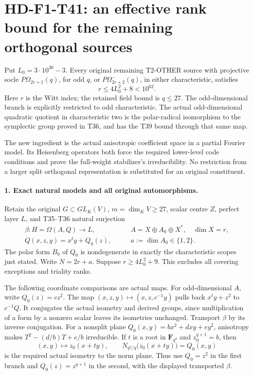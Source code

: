 \section[HD-F1-T41: the remaining orthogonal rank bounds]{HD-F1-T41: an effective rank bound for the remaining orthogonal sources}
\label{sec:f1-remaining-orthogonal-rank-cutoff}

Put \(L_0=3\cdot10^{30}-3\). Every original remaining
T2-OTHER source with projective socle
\(P\Omega_{2r+1}(q)\), for odd \(q\), or
\(P\Omega^-_{2r+2}(q)\), in either characteristic, satisfies
\[
             \boxed{\qquad r\le4L_0^2+8<10^{62}.\qquad}
 \tag{F1T41.1}
\]
Here \(r\) is the Witt index; the retained field bound is
\(q\le27\). The odd-dimensional branch is explicitly
restricted to odd characteristic. The actual odd-dimensional
quadratic quotient in characteristic two is the polar-radical
isomorphism to the symplectic group proved in T36, and has
the T39 bound through that same map.

The new ingredient is the actual anisotropic coefficient
space in a partial Fourier model. Its Heisenberg operators
both force the required lower-level code conditions and
prove the full-weight stabilizer's irreducibility. No
restriction from a larger split orthogonal representation
is substituted for an original constituent.

\paragraph{1. Exact natural models and all original automorphisms.}
Retain the original \(G\subset GL_K(V)\),
\(m=\dim_KV\ge27\), scalar centre \(Z\), perfect
layer \(L\), and T35--T36 natural surjection
\[
 \begin{aligned}
 \beta:H=\Omega(A,Q)\longrightarrow L,
 &\qquad A=X\oplus A_0\oplus X^*,\quad \dim X=r,\\
 Q(x,z,y)=x^ty+Q_0(z),
 &\qquad a:=\dim A_0\in\{1,2\}.
 \end{aligned}
 \tag{F1T41.2}
\]
The polar form \(B_0\) of \(Q_0\) is nondegenerate
in exactly the characteristic scopes just stated.
Write \(N=2r+a\). Suppose \(r\ge4L_0^2+9\).
This excludes all covering exceptions and triality ranks.

The following coordinate comparisons are actual maps.
For odd-dimensional \(A\), write \(Q_0(z)=c z^2\).
The map \((x,z,y)\mapsto(x,z,c^{-1}y)\) pulls back
\(x^ty+z^2\) to \(c^{-1}Q\). It conjugates the
actual isometry and derived groups, since multiplication
of a form by a nonzero scalar leaves its isometries
unchanged. Transport \(\beta\) by its inverse conjugation.
For a nonsplit plane \(Q_0(x,y)=b x^2+dxy+e y^2\),
anisotropy makes
\(T^2-(d/b)T+e/b\) irreducible. If \(t\) is a root
in \(\mathbf F_{q^2}\) and \(z_0^{q+1}=b\), then
\[
 (x,y)\longmapsto z_0(x+t y),\qquad
 N_{q^2/q}\bigl(z_0(x+t y)\bigr)=Q_0(x,y)
 \tag{F1T41.3}
\]
is the required actual isometry to the norm plane.
Thus use \(Q_0=z^2\) in the first branch and
\(Q_0(z)=z^{q+1}\) in the second, with the displayed
transported \(\beta\).

